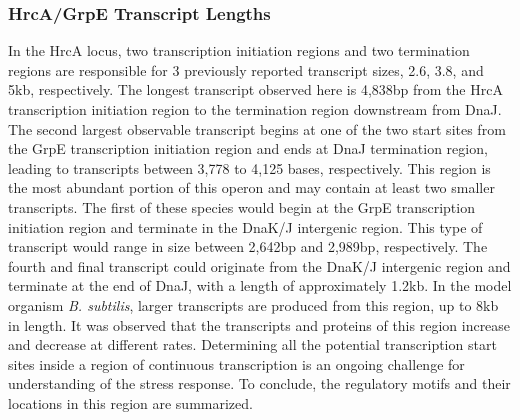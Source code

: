 \subsubsection{HrcA/GrpE Transcript Lengths}
In the HrcA locus, two transcription initiation regions and two termination regions are responsible for 3 previously reported transcript sizes, 2.6, 3.8, and 5kb, respectively. The longest transcript observed here is 4,838bp from the HrcA transcription initiation region to the termination region downstream from DnaJ. The second largest observable transcript begins at one of the two start sites from the GrpE transcription initiation region and ends at DnaJ termination region, leading to transcripts between 3,778 to 4,125 bases, respectively. This region is the most abundant portion of this operon and may contain at least two smaller transcripts. The first of these species would begin at the GrpE transcription initiation region and terminate in the DnaK/J intergenic region. This type of transcript would range in size between 2,642bp and 2,989bp, respectively. The fourth and final transcript could originate from the DnaK/J intergenic region and terminate at the end of DnaJ, with a length of approximately 1.2kb. In the model organism \textit{B. subtilis}, larger transcripts are produced from this region, up to 8kb in length\cite{81}. It was observed that the transcripts and proteins of this region increase and decrease at different rates\cite{81}. Determining all the potential transcription start sites inside a region of continuous transcription is an ongoing challenge for understanding of the stress response. To conclude, the regulatory motifs and their locations in this region are summarized.

